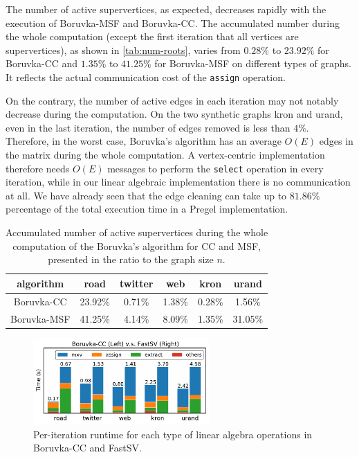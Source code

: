 \documentclass{sokendai_thesis} %
\newcommand{\boruvka}[0]{Boruvka}
\begin{document}
The number of active supervertices, as expected, decreases rapidly with the execution of \boruvka{}-MSF and \boruvka{}-CC.
The accumulated number during the whole computation (except the first iteration that all vertices are supervertices), as shown in \autoref{tab:num-roots}, varies from $0.28\%$ to $23.92\%$ for \boruvka{}-CC and $1.35\%$ to $41.25\%$ for \boruvka{}-MSF on different types of graphs.
It reflects the actual communication cost of the \texttt{assign} operation.

On the contrary, the number of active edges in each iteration may not notably decrease during the computation.
On the two synthetic graphs kron and urand, even in the last iteration, the number of edges removed is less than $4\%$.
Therefore, in the worst case, \boruvka{}'s algorithm has an average $O(E)$ edges in the matrix during the whole computation.
A vertex-centric implementation therefore needs $O(E)$ messages to perform the \texttt{select} operation in every iteration, while in our linear algebraic implementation there is no communication at all.
We have already seen that the edge cleaning can take up to $81.86\%$ percentage of the total execution time in a Pregel implementation.

\begin{table}
\centering
\caption{Accumulated number of active supervertices during the whole computation of the \boruvka{}'s algorithm for CC and MSF, presented in the ratio to the graph size $n$.}
\label{tab:num-roots}
\vspace{-8pt}
\begin{tabular}{c|c|c|c|c|c}
\hline
algorithm & road & twitter & web & kron & urand \\
\hline
\boruvka{}-CC & 23.92\% & 0.71\% & 1.38\% & 0.28\% & 1.56\% \\
\boruvka{}-MSF & 41.25\% & 4.14\% & 8.09\% & 1.35\% & 31.05\% \\
\hline
\end{tabular}
\vspace{-4pt}
\end{table}

\begin{figure}
\centering
\includegraphics[width=0.6\textwidth]{figures/CC-breakdown.pdf}
\caption{Per-iteration runtime for each type of linear algebra operations in \boruvka{}-CC and FastSV.}
\vspace{-10pt}
\label{fig:breakdown}
\end{figure}
\end{document}
